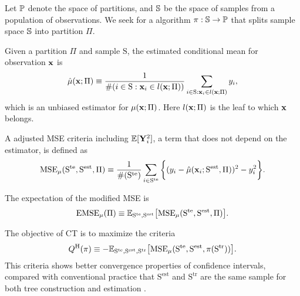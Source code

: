     Let $\mathbb{P}$ denote the space of partitions, and $\mathbb{S}$ be the space of samples from a population of observations. We seek for a algorithm $\pi: \mathbb{S} \rightarrow \mathbb{P}$ that splits sample space $\mathbb{S}$ into partition $\Pi$. 

    Given a partition $\Pi$ and sample $\mathrm{S}$, the estimated conditional mean for observation $\mathbf{x}$ is 
    \begin{equation*}
      \hat{\mu} (\mathbf{x}; \Pi) \equiv \frac{1}{\#(i \in \mathrm{S}: \mathbf{x}_i \in l(\mathbf{x}; \Pi))} \sum_{i \in \mathrm{S}: \mathbf{x}_i \in l(\mathbf{x}; \Pi)} y_i, 
    \end{equation*}
    which is an unbiased estimator for $\mu (\mathbf{x}; \Pi)$. Here $l(\mathbf{x}; \Pi)$ is the leaf to which $\mathbf{x}$ belongs.

    A adjusted MSE criteria including $\mathbb{E}[\mathbf{Y}_i^2]$, a term that does not depend on the estimator, is defined as 
    \begin{equation}
      \label{eqn:ite_mse}
      \mathrm{MSE}_\mu (\mathrm{S^{te}}, \mathrm{S^{est}}, \Pi) \equiv \frac{1}{\# (\mathrm{S^{te}})} \sum_{i 
      \in \mathrm{S^{te}}} \bigg \{ (y_i - \hat{\mu}(\mathbf{x}_i; \mathrm{S^{est}}, \Pi) )^2  - y_i^2 \bigg \}.
    \end{equation}

    The expectation of the modified MSE is 
    \begin{equation*}
      \mathrm{EMSE}_\mu (\Pi) \equiv \mathbb{E}_{\mathrm{S^{te}}, \mathrm{S^{est}}} \big [ \mathrm{MSE}_\mu (\mathrm{S^{te}}, \mathrm{S^{est}}, \Pi) \big ].
    \end{equation*}

    The objective of CT is to maximize the criteria
    \begin{equation}
      Q^\mathrm{H}(\pi) \equiv - \mathbb{E}_{\mathrm{S^{te}}, \mathrm{S^{est}}, \mathrm{S^{tr}}} \big [ \mathrm{MSE}_\mu (\mathrm{S^{te}}, \mathrm{S^{est}}, \pi(\mathrm{S^{tr}})) \big ].
    \end{equation}
    This criteria shows better convergence properties of confidence intervals, compared with conventional practice that $\mathrm{S^{est}}$ and $\mathrm{S^{tr}}$ are the same sample for both tree construction and estimation \cite{wager2018estimation}.

